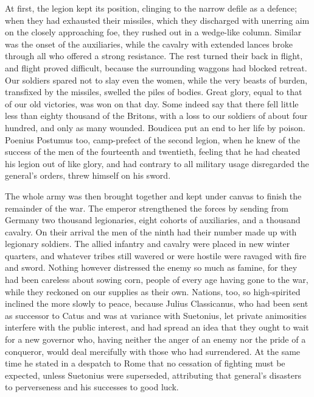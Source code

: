 
At first, the legion kept its position, clinging to the narrow defile as a defence; when they had exhausted their missiles, which they discharged with unerring aim on the closely approaching foe, they rushed out in a wedge-like column. Similar was the onset of the auxiliaries, while the cavalry with extended lances broke through all who offered a strong resistance. The rest turned their back in flight, and flight proved difficult, because the surrounding waggons had blocked retreat. Our soldiers spared not to slay even the women, while the very beasts of burden, transfixed by the missiles, swelled the piles of bodies. Great glory, equal to that of our old victories, was won on that day. Some indeed say that there fell little less than eighty thousand of the Britons, with a loss to our soldiers of about four hundred, and only as many wounded. Boudicea put an end to her life by poison. Poenius Postumus too, camp-prefect of the second legion, when he knew of the success of the men of the fourteenth and twentieth, feeling that he had cheated his legion out of like glory, and had contrary to all military usage disregarded the general's orders, threw himself on his sword.


The whole army was then brought together and kept under canvas to finish the remainder of the war. The emperor strengthened the forces by sending from Germany two thousand legionaries, eight cohorts of auxiliaries, and a thousand cavalry. On their arrival the men of the ninth had their number made up with legionary soldiers. The allied infantry and cavalry were placed in new winter quarters, and whatever tribes still wavered or were hostile were ravaged with fire and sword. Nothing however distressed the enemy so much as famine, for they had been careless about sowing corn, people of every age having gone to the war, while they reckoned on our supplies as their own. Nations, too, so high-spirited inclined the more slowly to peace, because Julius Classicanus, who had been sent as successor to Catus and was at variance with Suetonius, let private animosities interfere with the public interest, and had spread an idea that they ought to wait for a new governor who, having neither the anger of an enemy nor the pride of a conqueror, would deal mercifully with those who had surrendered. At the same time he stated in a despatch to Rome that no cessation of fighting must be expected, unless Suetonius were superseded, attributing that general's disasters to perverseness and his successes to good luck.

